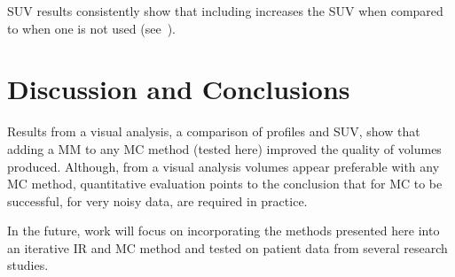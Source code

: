     \gls{SUV} results consistently show that including  increases the \gls{SUV} when compared to when one is not used (see~).


\section{Discussion and Conclusions} \label{sec:discussion_and_conclusions}
    Results from a visual analysis, a comparison of profiles and \gls{SUV}, show that adding a \gls{MM} to any \gls{MC} method (tested here) improved the quality of volumes produced. Although, from a visual analysis volumes appear preferable with any \gls{MC} method, quantitative evaluation points to the conclusion that for \gls{MC} to be successful, for very noisy data,  are required in practice.
    
    In the future, work will focus on incorporating the methods presented here into an iterative \acrlong{IR} and \gls{MC} method and tested on patient data from several research studies.%
    